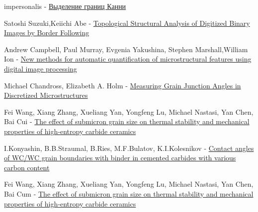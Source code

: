 \documentclass[a4paper, 14pt]{article}
\begin{document}
\begin{thebibliography}{}
	   impersonalis   -  \href{https://habr.com/ru/post/114589/}{Выделение границ Канни}
	
	  Satoshi Suzuki,Keiichi Abe   -  \href{https://www.sciencedirect.com/science/article/abs/pii/0734189X85900167}{Topological Structural Analysis of Digitized Binary Images by Border Following}
	
	  Andrew Campbell, Paul Murray, Evgenia Yakushina, Stephen Marshall,William Ion   -  \href{https://www.sciencedirect.com/science/article/pii/S0264127517311620}{New methods for automatic quantification of microstructural features using digital image processing}
	
	 Michael Chandross, Elizabeth A. Holm   -  \href{https://link.springer.com/article/10.1007%2Fs11661-010-0355-7}{Measuring Grain Junction Angles in Discretized Microstructures}
		
	 Fei Wang, Xiang Zhang, Xueliang Yan, Yongfeng Lu, Michael Nastasi, Yan Chen, Bai Cui  -  \href{https://ceramics.onlinelibrary.wiley.com/doi/abs/10.1111/jace.17103}{The effect of submicron grain size on thermal stability and mechanical properties of high‐entropy carbide ceramics}
	
	 I.Konyashin, B.B.Straumal, B.Ries, M.F.Bulatov, K.I.Kolesnikov   -  \href{https://www.sciencedirect.com/science/article/abs/pii/S0167577X17303361}{Contact angles of WC/WC grain boundaries with binder in cemented
		carbides with various carbon content}
		
	 Fei Wang, Xiang Zhang, Xueliang Yan, Yongfeng Lu, Michael Nastasi, Yan Chen, Bai Cum   -  \href{https://ceramics.onlinelibrary.wiley.com/doi/abs/10.1111/jace.17103}{The effect of submicron grain size on thermal stability and mechanical properties of high‐entropy carbide ceramics}

\end{thebibliography}




	
\end{document}
